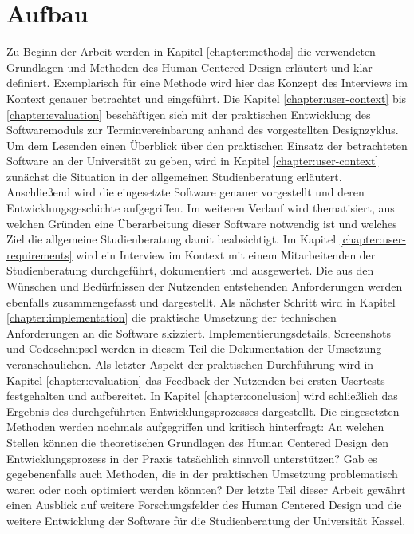 \section{Aufbau}
Zu Beginn der Arbeit werden in Kapitel \ref{chapter:methods} die
verwendeten Grundlagen und Methoden des Human Centered Design erläutert
und klar definiert. Exemplarisch für eine Methode wird hier das Konzept des
Interviews im Kontext genauer betrachtet und eingeführt. Die
Kapitel \ref{chapter:user-context} bis \ref{chapter:evaluation} beschäftigen sich
mit der praktischen Entwicklung des Softwaremoduls zur Terminvereinbarung
anhand des vorgestellten Designzyklus. Um dem Lesenden einen Überblick über den
praktischen Einsatz der betrachteten Software an der Universität zu geben, wird
in Kapitel \ref{chapter:user-context} zunächst die Situation in der allgemeinen
Studienberatung erläutert. Anschließend wird die eingesetzte Software genauer
vorgestellt und deren Entwicklungsgeschichte aufgegriffen. Im weiteren Verlauf
wird thematisiert, aus welchen Gründen eine Überarbeitung dieser
Software notwendig ist und welches Ziel die allgemeine Studienberatung damit
beabsichtigt. Im Kapitel  \ref{chapter:user-requirements} wird ein Interview im
Kontext mit einem Mitarbeitenden der Studienberatung durchgeführt, dokumentiert
und ausgewertet. Die aus den Wünschen und Bedürfnissen der Nutzenden
entstehenden Anforderungen werden ebenfalls zusammengefasst und dargestellt. Als nächster Schritt wird in Kapitel \ref{chapter:implementation} die
praktische Umsetzung der technischen Anforderungen an die Software skizziert. Implementierungsdetails, Screenshots und Codeschnipsel werden in diesem
Teil die Dokumentation der Umsetzung veranschaulichen. Als letzter Aspekt der
praktischen Durchführung wird in Kapitel \ref{chapter:evaluation} das Feedback
der Nutzenden bei ersten \glspl{Usertest} festgehalten und aufbereitet. In
Kapitel \ref{chapter:conclusion} wird schließlich das Ergebnis des
durchgeführten Entwicklungsprozesses dargestellt. Die eingesetzten Methoden
werden nochmals aufgegriffen und kritisch hinterfragt: An welchen Stellen
können die theoretischen Grundlagen des Human Centered Design den
Entwicklungsprozess in der Praxis tatsächlich sinnvoll unterstützen? Gab es
gegebenenfalls auch Methoden, die in der praktischen Umsetzung problematisch waren
oder noch optimiert werden könnten? Der letzte Teil dieser Arbeit gewährt einen Ausblick auf weitere Forschungsfelder des Human Centered
Design und die weitere Entwicklung der Software für die Studienberatung der
Universität Kassel.
